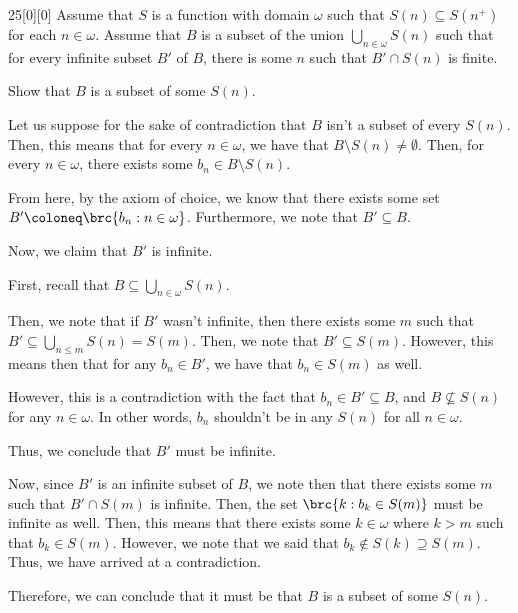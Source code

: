 \documentclass{article}
\begin{document}
\begin{hw}{25}[0][0]
	Assume that $S$ is a function with domain $\omega$ such that $S(n) \subseteq S(n^{+})$ for each $n \in \omega$. Assume that $B$ is a subset of the union $\bigcup_{n \in \omega} S(n)$ such that for every infinite subset $B'$ of $B$, there is some $n$ such that $B' \cap S(n)$ is finite.
	
	Show that $B$ is a subset of some $S(n)$.
\end{hw}
\begin{solution}
	Let us suppose for the sake of contradiction that $B$ isn't a subset of every $S(n)$. Then, this means that for every $n \in \omega$, we have that $B \setminus S(n) \neq \emptyset$. Then, for every $n \in \omega$, there exists some $b_n \in B \setminus S(n)$.
	
	From here, by the axiom of choice, we know that there exists some set $B' \coloneq \brc{b_n : n \in \omega}$. Furthermore, we note that $B' \subseteq B$.
	
	Now, we claim that $B'$ is infinite.
	\begin{innerproof}
		First, recall that $B \subseteq \bigcup_{n \in \omega} S(n)$.
		
		Then, we note that if $B'$ wasn't infinite, then there exists some $m$ such that $B' \subseteq \bigcup_{n \leq m} S(n) = S(m)$. Then, we note that $B' \subseteq S(m)$. However, this means then that for any $b_n \in B'$, we have that $b_n \in S(m)$ as well.
		
		However, this is a contradiction with the fact that $b_n \in B' \subseteq B$, and $B \not\subseteq S(n)$ for any $n \in \omega$. In other words, $b_n$ shouldn't be in any $S(n)$ for all $n \in \omega$.
		
		Thus, we conclude that $B'$ must be infinite.
	\end{innerproof}
	
	Now, since $B'$ is an infinite subset of $B$, we note then that there exists some $m$ such that $B' \cap S(m)$ is infinite. Then, the set $\brc{k : b_k \in S(m)}$ must be infinite as well. Then, this means that there exists some $k \in \omega$ where $k > m$ such that $b_k \in S(m)$. However, we note that we said that $b_k \not\in S(k) \supseteq S(m)$. Thus, we have arrived at a contradiction.
	
	Therefore, we can conclude that it must be that $B$ is a subset of some $S(n)$.
\end{solution}
\end{document}
